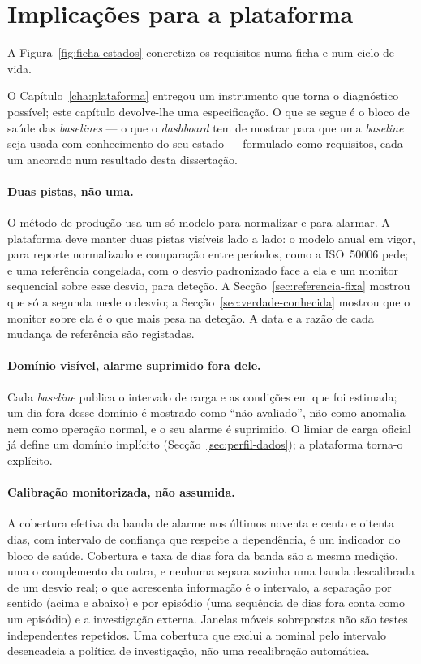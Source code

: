 \section{Implicações para a plataforma}
\label{sec:implicacoes-plataforma}
A Figura~\ref{fig:ficha-estados} concretiza os requisitos numa ficha e num ciclo de vida.



O Capítulo~\ref{cha:plataforma} entregou um instrumento que torna o
diagnóstico possível; este capítulo devolve-lhe uma especificação. O que se
segue é o bloco de saúde das \emph{baselines} --- o que o \emph{dashboard}
tem de mostrar para que uma \emph{baseline} seja usada com conhecimento do
seu estado --- formulado como requisitos, cada um ancorado num resultado
desta dissertação.

\paragraph{Duas pistas, não uma.} O método de produção usa um só modelo para
normalizar e para alarmar. A plataforma deve manter duas pistas visíveis
lado a lado: o modelo anual em vigor, para reporte normalizado e comparação
entre períodos, como a ISO~50006 pede; e uma referência congelada, com o
desvio padronizado face a ela e um monitor sequencial sobre esse desvio,
para deteção. A Secção~\ref{sec:referencia-fixa} mostrou que só a segunda
mede o desvio; a Secção~\ref{sec:verdade-conhecida} mostrou que o monitor
sobre ela é o que mais pesa na deteção. A data e a razão de cada mudança de
referência são registadas.

\paragraph{Domínio visível, alarme suprimido fora dele.} Cada
\emph{baseline} publica o intervalo de carga e as condições em que foi
estimada; um dia fora desse domínio é mostrado como ``não avaliado'', não
como anomalia nem como operação normal, e o seu alarme é suprimido. O limiar de carga oficial já
define um domínio implícito (Secção~\ref{sec:perfil-dados}); a plataforma
torna-o explícito.

\paragraph{Calibração monitorizada, não assumida.} A cobertura efetiva da
banda de alarme nos últimos noventa e cento e oitenta dias, com intervalo de
confiança que respeite a dependência, é um indicador do bloco de saúde.
Cobertura e taxa de dias fora da banda são a mesma medição, uma o
complemento da outra, e nenhuma separa sozinha uma banda descalibrada de um
desvio real; o que acrescenta informação é o intervalo, a separação por
sentido (acima e abaixo) e por episódio (uma sequência de dias fora conta
como um episódio) e a investigação externa. Janelas móveis sobrepostas não
são testes independentes repetidos. Uma cobertura
que exclui a nominal pelo intervalo desencadeia a política de investigação,
não uma recalibração automática.

